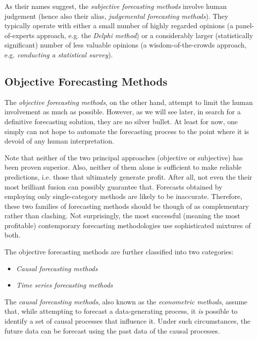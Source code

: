 As their names suggest, the \textit{subjective forecasting methods} involve human judgement (hence also their alias, \textit{judgemental forecasting methods}). They typically operate with either a small number of highly regarded opinions (a panel-of-experts approach, e.g. the \textit{Delphi method}) or a considerably larger (statistically significant) number of less valuable opinions (a wisdom-of-the-crowds approach, e.g. \textit{conducting a statistical survey}).

\subsection{Objective Forecasting Methods}

The \textit{objective forecasting methods}, on the other hand, attempt to limit the human involvement as much as possible. However, as we will see later, in search for a definitive forecasting solution, they are no silver bullet. At least for now, one simply can not hope to automate the forecasting process to the point where it is devoid of any human interpretation.

Note that neither of the two principal approaches (objective or subjective) has been proven superior. Also, neither of them alone is sufficient to make reliable predictions, i.e. those that ultimately generate profit. After all, not even the their most brilliant fusion can possibly guarantee that. Forecasts obtained by employing only single-category methods are likely to be inaccurate. Therefore, these two families of forecasting methods should be though of as complementary rather than clashing. Not surprisingly, the most successful (meaning the most profitable) contemporary forecasting methodologies use sophisticated mixtures of both.

The objective forecasting methods are further classified into two categories:

\begin{itemize}
\item \textit{Causal forecasting methods}
\item \textit{Time series forecasting methods}
\end{itemize}

The \textit{causal forecasting methods}, also known as the \textit{econometric methods}, assume that, while attempting to forecast a data-generating process, it \textit{is} possible to identify a set of causal processes that influence it. Under such circumstances, the future data can be forecast using the past data of the causal processes.

